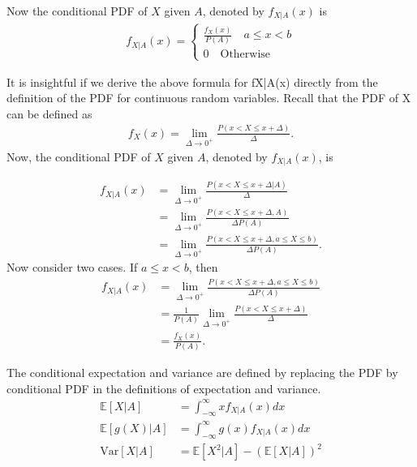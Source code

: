 Now the conditional PDF of $X$ given $A$, denoted by $f_{X|A}(x)$ is 
\begin{align*}
	f_{X|A}(x) = 
	\begin{cases}
	\frac{f_{X}(x)}{P(A)}\quad a\leq x <b\\	
	0\quad \text{Otherwise}\
	\end{cases}
\end{align*}

It is insightful if we derive the above formula for fX|A(x) directly from the definition of the PDF for continuous random variables. Recall that the PDF of X can be defined as
\begin{align*}
	f_X(x)=\lim_{\Delta \rightarrow 0^+} \frac{P(x<X \leq x+\Delta)}{\Delta}.
\end{align*}
Now, the conditional PDF of $X$ given $A$, denoted by $f_{X|A}(x)$, is

\begin{align*}
	 f_{X|A}(x)&=\lim_{\Delta \rightarrow 0^+} \frac{P(x<X \leq x+\Delta|A)}{\Delta}\\
	 &=\lim_{\Delta \rightarrow 0^+} \frac{P(x<X \leq x+\Delta,A)}{\Delta P(A)}\\
	 &=\lim_{\Delta \rightarrow 0^+} \frac{P(x<X \leq x+\Delta,a \leq X \leq b)}{\Delta P(A)}.
\end{align*}
Now consider two cases. If $a\leq x < b$, then
\begin{align*}
	 f_{X|A}(x)&=\lim_{\Delta \rightarrow 0^+} \frac{P(x<X \leq x+\Delta,a \leq X \leq b)}{\Delta P(A)}\\
	 &=\frac{1}{P(A)}\lim_{\Delta \rightarrow 0^+} \frac{P(x<X \leq x+\Delta)}{\Delta}\\
	 &=\frac{f_X(x)}{P(A)}.
\end{align*}

The conditional expectation and variance are defined by replacing the PDF by conditional PDF in the definitions of expectation and variance. 
\begin{align*}
	\mathbb{E}[X|A] &= \int_{-\infty}^{\infty}xf_{X|A}(x)dx\\
	\mathbb{E}[g(X)|A]	&= \int_{-\infty}^{\infty}g(x)f_{X|A}(x)dx\\
	\text{Var}[X|A]	&=\mathbb{E}[X^2|A]-\left(\mathbb{E}[X|A]\right)^2
\end{align*}


